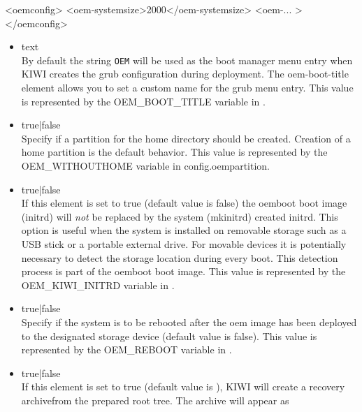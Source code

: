 \begin{itemize}
\begin{xml}
<oemconfig>
  <oem-systemsize>2000</oem-systemsize>
  <oem-... >
</oemconfig>
\end{xml}

	\begin{itemize}
    \item {}text\\
       By default the string \verb!OEM! will be used as the boot manager 
       menu entry when KIWI creates the grub configuration during
       deployment. The oem-boot-title element allows you to set a custom
       name for the grub menu entry. This value is represented by the
       OEM\_BOOT\_TITLE variable in .
	\item {}true|false\\
       Specify if a partition for the home directory should be created.
       Creation of a home partition is the default behavior. This value is 
       represented by the OEM\_WITHOUTHOME variable in config.oempartition.
	\item {}true|false\\
       If this element is set to true (default value is false) the oemboot 
       boot image (initrd) will \emph{not} be replaced by the system 
       (mkinitrd) created initrd. This option is useful when the system
       is installed on removable storage such as a USB stick or a portable
       external drive. For movable devices it is potentially necessary to 
       detect the storage location during every boot. This detection
       process is part of the oemboot boot image. This value is represented
       by the OEM\_KIWI\_INITRD variable in .
	\item {}true|false\\
       Specify if the system is to be rebooted after the oem image has been
       deployed to the designated storage device (default value is false). 
       This value is represented by the OEM\_REBOOT variable in 
       .
	\item {}true|false\\
      If this element is set to true (default value is ), KIWI will
      create a recovery archivefrom the prepared root tree. The archive will 
      appear as 

\end{itemize}
\end{itemize}
